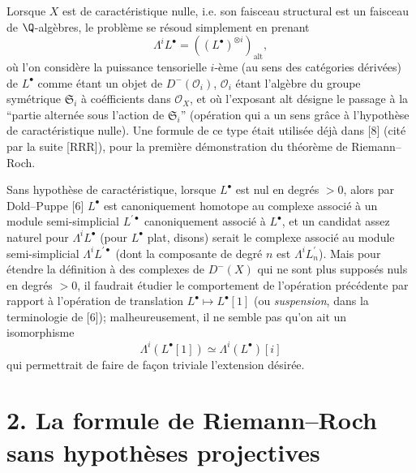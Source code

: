 Lorsque $X$ est de caractéristique nulle, i.e. son faisceau structural est un faisceau de $\Q$-algèbres, le problème se résoud simplement en prenant
\begin{equation}\tag{1.2}
 \Lambda^i L^\bullet=\left((L^\bullet)^{\otimes i}\right)_{\mathrm{alt}},
\end{equation}
où l'on considère la puissance tensorielle $i$-ème (au sens des catégories dérivées) de $L^\bullet$ comme étant un objet de $D^-(\mathcal O_i)$, $\mathcal O_i$ étant l'algèbre du groupe symétrique $\mathfrak S_i$ à coéfficients dans $\mathcal O_X$, et où l'exposant alt désigne le passage à la ``partie alternée sous l'action de $\mathfrak S_i$'' (opération qui a un sens grâce à l'hypothèse de caractéristique nulle). Une formule de ce type était utilisée déjà dans [8] (cité par la suite [RRR]), pour la première démonstration du théorème de Riemann--Roch.

Sans hypothèse de caractéristique, lorsque $L^\bullet$ est nul en degrés $>0$, alors par Dold--Puppe [6] $L^\bullet$ est canoniquement homotope au complexe associé à un module semi-simplicial $L^{\prime\bullet}$ canoniquement associé à $L^\bullet$, et un candidat assez naturel pour $\Lambda^iL^\bullet$ (pour $L^\bullet$ plat, disons) serait le complexe associé au module semi-simplicial $\Lambda^iL^{\prime\bullet}$ (dont la composante de degré $n$ est $\Lambda^i L^{\prime}_n$). Mais pour étendre la définition à des complexes de $D^-(X)$ qui ne sont plus supposés nuls en degrés $>0$, il faudrait étudier le comportement de l'opération précédente par rapport à l'opération de translation $L^\bullet\mapsto L^\bullet[1]$ (ou \emph{suspension}, dans la terminologie de [6]); malheureusement, il ne semble pas qu'on ait un isomorphisme
\[
 \Lambda^i(L^\bullet[1])\simeq \Lambda^i(L^\bullet)[i]
\]
qui permettrait de faire de façon triviale l'extension désirée.

\section*{2. La formule de Riemann--Roch sans hypothèses projectives}

